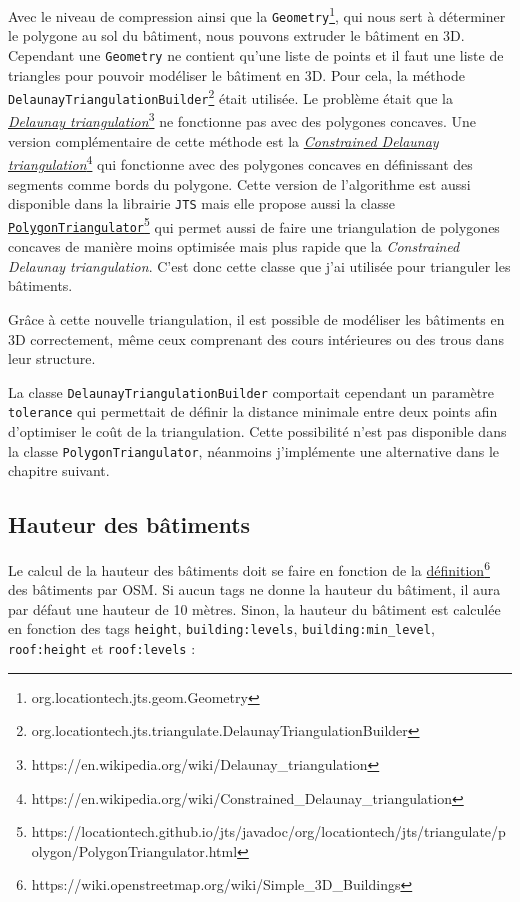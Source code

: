Avec le niveau de compression ainsi que la \texttt{Geometry}\footnote{org.locationtech.jts.geom.Geometry}, qui nous sert à déterminer le polygone au sol du bâtiment, nous pouvons extruder le bâtiment en 3D. Cependant une \texttt{Geometry} ne contient qu'une liste de points et il faut une liste de triangles pour pouvoir modéliser le bâtiment en 3D. Pour cela, la méthode \texttt{DelaunayTriangulationBuilder}\footnote{org.locationtech.jts.triangulate.DelaunayTriangulationBuilder} était utilisée. Le problème était que la \href{https://en.wikipedia.org/wiki/Delaunay_triangulation}{\textit{Delaunay triangulation}}\footnote{https://en.wikipedia.org/wiki/Delaunay\_triangulation} ne fonctionne pas avec des polygones concaves. Une version complémentaire de cette méthode est la \href{https://en.wikipedia.org/wiki/Constrained_Delaunay_triangulation}{\textit{Constrained Delaunay triangulation}}\footnote{https://en.wikipedia.org/wiki/Constrained\_Delaunay\_triangulation} qui fonctionne avec des polygones concaves en définissant des segments comme bords du polygone. Cette version de l'algorithme est aussi disponible dans la librairie \texttt{JTS} mais elle propose aussi la classe \href{https://locationtech.github.io/jts/javadoc/org/locationtech/jts/triangulate/polygon/PolygonTriangulator.html}{\texttt{PolygonTriangulator}}\footnote{https://locationtech.github.io/jts/javadoc/org/locationtech/jts/triangulate/polygon/PolygonTriangulator.html} qui permet aussi de faire une triangulation de polygones concaves de manière moins optimisée mais plus rapide que la \textit{Constrained Delaunay triangulation}. C'est donc cette classe que j'ai utilisée pour trianguler les bâtiments.

Grâce à cette nouvelle triangulation, il est possible de modéliser les bâtiments en 3D correctement, même ceux comprenant des cours intérieures ou des trous dans leur structure.

La classe \texttt{DelaunayTriangulationBuilder} comportait cependant un paramètre \texttt{tolerance} qui permettait de définir la distance minimale entre deux points afin d'optimiser le coût de la triangulation. Cette possibilité n'est pas disponible dans la classe \texttt{PolygonTriangulator}, néanmoins j'implémente une alternative dans le chapitre suivant.

\subsection{Hauteur des bâtiments}

Le calcul de la hauteur des bâtiments doit se faire en fonction de la \href{https://wiki.openstreetmap.org/wiki/Simple_3D_Buildings}{définition}\footnote{https://wiki.openstreetmap.org/wiki/Simple\_3D\_Buildings} des bâtiments par OSM. Si aucun tags ne donne la hauteur du bâtiment, il aura par défaut une hauteur de 10 mètres. Sinon, la hauteur du bâtiment est calculée en fonction des tags \texttt{height}, \texttt{building:levels}, \texttt{building:min\_level}, \texttt{roof:height} et \texttt{roof:levels} :

